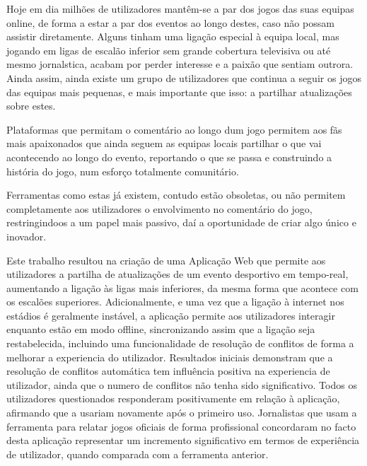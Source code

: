 Hoje em dia milhões de utilizadores mantêm-se a par dos jogos das suas equipas online, de forma a estar a par dos eventos ao longo destes, caso não possam assistir diretamente. Alguns tinham uma ligação especial à equipa local, mas jogando em ligas de escalão inferior sem grande cobertura televisiva ou até mesmo jornalstica, acabam por perder interesse e a paixão que sentiam outrora. Ainda assim, ainda existe um grupo de utilizadores que continua a seguir os jogos das equipas mais pequenas, e mais importante que isso: a partilhar atualizações sobre estes. 

Plataformas que permitam o comentário ao longo dum jogo permitem aos fãs mais apaixonados que ainda seguem as equipas locais partilhar o que vai acontecendo ao longo do evento, reportando o que se passa e construindo a história do jogo, num esforço totalmente comunitário. 

Ferramentas como estas já existem, contudo estão obsoletas, ou não permitem completamente aos utilizadores o envolvimento no comentário do jogo, restringindoos a um papel mais passivo, daí a oportunidade de criar algo único e inovador. 

Este trabalho resultou na criação de uma Aplicação Web que permite aos utilizadores a partilha de atualizações de um evento desportivo em tempo-real, aumentando a ligação às ligas mais inferiores, da mesma forma que acontece com os escalões superiores. Adicionalmente, e uma vez que a ligação à internet nos estádios é geralmente instável, a aplicação permite aos utilizadores interagir enquanto estão em modo offline, sincronizando assim que a ligação seja restabelecida, incluindo uma funcionalidade de resolução de conflitos de forma a melhorar a experiencia do utilizador. Resultados iniciais demonstram que a resolução de conflitos automática tem influência positiva na experiencia de utilizador, ainda que o numero de conflitos não tenha sido significativo. Todos os utilizadores questionados responderam positivamente em relação à aplicação, afirmando que a usariam novamente após o primeiro uso. Jornalistas que usam a ferramenta para relatar jogos oficiais de forma profissional concordaram no facto desta aplicação representar um incremento significativo em termos de experiência de utilizador, quando comparada com a ferramenta anterior. 


\vspace*{10mm}\noindent

